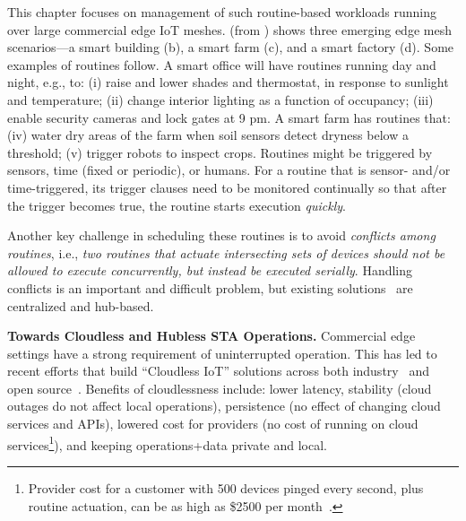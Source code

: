 This chapter focuses on management of such routine-based workloads running over large commercial edge IoT meshes.  (from ) shows three emerging edge mesh scenarios---a smart building (b), a smart farm (c), and a smart factory (d).
Some examples of routines follow. A  smart office will have routines running day and night, e.g., to: (i) raise and lower shades and thermostat, in response to sunlight and temperature; (ii) change interior lighting as a function of occupancy; (iii) enable security cameras and lock gates at 9 pm. 
A smart farm has routines that: (iv) water dry areas of the farm when soil sensors detect dryness below a threshold; (v) trigger robots to inspect crops. 
Routines might be triggered by sensors, time (fixed or periodic), or humans. 
For a routine that is sensor- and/or time-triggered, its trigger clauses need to be monitored continually so that after the trigger becomes true, the routine starts execution {\it quickly}. 

Another key  challenge in scheduling these routines is to avoid
{\it conflicts among routines}, i.e., {\it two routines that actuate intersecting sets of devices should not be allowed to execute concurrently, but instead be executed serially}. Handling conflicts is an important and difficult problem, but existing solutions~\cite{Safehome} are centralized and hub-based.  

{\noindent \bf Towards Cloudless and Hubless STA Operations. }  
Commercial edge settings have a strong requirement of uninterrupted operation. This has led to recent efforts that build ``Cloudless IoT'' solutions across both industry~\cite{Thingsquare}
and open source~\cite{HACloudless,csa2025matter}.
Benefits of cloudlessness include: lower latency, stability (cloud outages do not affect local operations), persistence (no effect of changing cloud services and APIs), lowered cost for providers (no cost of running on cloud services\footnote{Provider cost for a customer with 500 devices pinged every second, plus routine actuation, can be as high as \$2500 per month~\cite{AzureIoTHub}.}), 
and keeping operations+data private and local.


